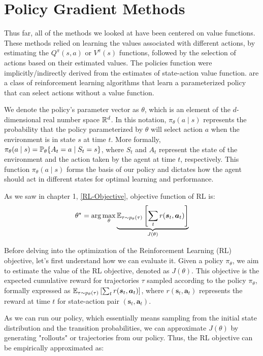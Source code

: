 \section{Policy Gradient Methods}
Thus far, all of the methods we looked at have been centered on value functions. These methods relied on learning the values associated with different actions, by estimating the $Q^{\pi}(s,a)$ or $V^{\pi}(s)$ functions, followed by the selection of actions based on their estimated values. The policies function were implicitly/indirectly derived from the estimates of state-action value function. 
 are a class of reinforcement learning algorithms that learn a parameterized policy that can select actions without a value function. 

We denote the policy's parameter vector as $\theta$, which is an element of the $d$-dimensional real number space $\mathbb R^d$. In this notation, $\pi_{\theta}(a \mid s)$ represents the probability that the policy parameterized by $\theta$ will select action $a$ when the environment is in state $s$ at time $t$. More formally, $\pi_{\theta}(a \mid s) = \mathbb P_{\theta} \{A_t = a \mid S_t = s \}$, where $S_t$ and $A_t$ represent the state of the environment and the action taken by the agent at time $t$, respectively. This function $\pi_{\theta}(a \mid s)$ forms the basis of our policy and dictates how the agent should act in different states for optimal learning and performance.

As we saw in chapter 1, \ref{RL-Objective}, objective function of RL is:
\begin{align*}\label{RL-Objective}
    \theta^{\star} = \arg \max_{\theta} \underbrace{\mathbb E_{\tau \sim p_{\theta}(\tau)} \left[ 
    \sum_{t} r(\boldsymbol{s}_t, \boldsymbol{a}_t)
    \right]}_{J(\theta)}
\end{align*}

Before delving into the optimization of the Reinforcement Learning (RL) objective, let's first understand how we can evaluate it. Given a policy $\pi_{\theta}$, we aim to estimate the value of the RL objective, denoted as $J(\theta)$. This objective is the expected cumulative reward for trajectories $\tau$ sampled according to the policy $\pi_{\theta}$, formally expressed as $\mathbb E_{\tau \sim p_{\theta}(\tau)} \left[ \sum_{t} r(\boldsymbol{s}_t, \boldsymbol{a}_t) \right]$, where $r(\boldsymbol{s}_t, \boldsymbol{a}_t)$ represents the reward at time $t$ for state-action pair $(\boldsymbol{s}_t, \boldsymbol{a}_t)$.

As we can run our policy, which essentially means sampling from the initial state distribution and the transition probabilities, we can approximate $J(\theta)$ by generating "rollouts" or trajectories from our policy. Thus, the RL objective can be empirically approximated as:

